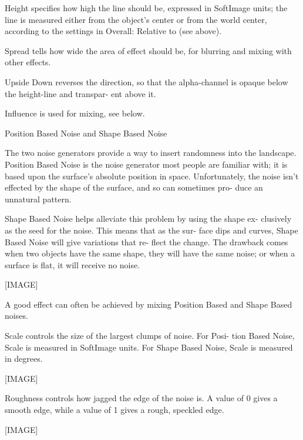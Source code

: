        Height specifies how high the line
       should be, expressed in SoftImage
       units; the line is measured either
       from the object's center or from
       the world center, according to the
       settings in Overall: Relative to
       (see above).

       Spread tells how wide the area of
       effect should be, for blurring and
       mixing with other effects.

       Upside Down reverses the direction,
       so that the alpha-channel is opaque
       below the height-line and transpar-
       ent above it.

       Influence is used for mixing, see
       below.



       Position Based Noise and Shape
       Based Noise

       The two noise generators provide a
       way to insert randomness into the
       landscape. Position Based Noise is
       the noise generator most people are
       familiar with; it is based upon the
       surface's absolute position in
       space. Unfortunately, the noise
       isn't effected by the shape of the
       surface, and so can sometimes pro-
       duce an unnatural pattern.

       Shape Based Noise helps alleviate
       this problem by using the shape ex-
       clusively as the seed for the
       noise. This means that as the sur-
       face dips and curves, Shape Based
       Noise will give variations that re-
       flect the change. The drawback
       comes when two objects have the
       same shape, they will have the same
       noise; or when a surface is flat,
       it will receive no noise.

       [IMAGE]

       A good effect can often be achieved
       by mixing Position Based and Shape
       Based noises.

       Scale controls the size of the
       largest clumps of noise.  For Posi-
       tion Based Noise, Scale is measured
       in SoftImage units.  For Shape
       Based Noise, Scale is measured in
       degrees.

       [IMAGE]

       Roughness controls how jagged the
       edge of the noise is. A value of 0
       gives a smooth edge, while a value
       of 1 gives a rough, speckled edge.

       [IMAGE]

